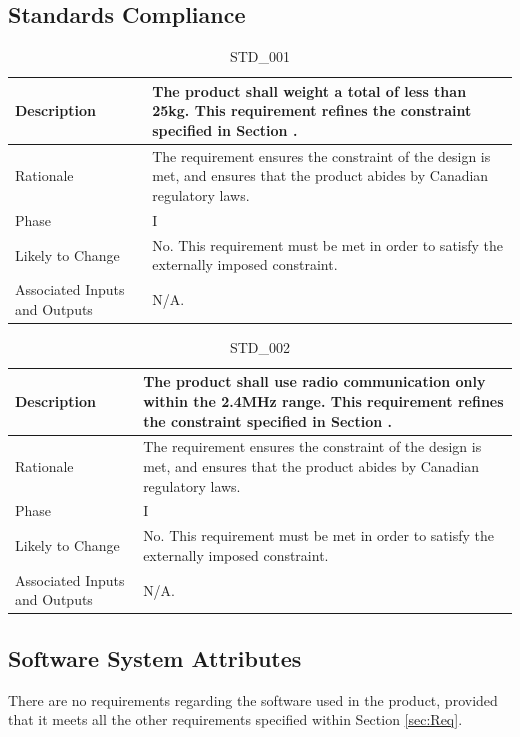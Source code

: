 \documentclass{article}
\begin{document}
\subsection{Standards Compliance }
\begin{table}[!h]
\begin{center}
\caption {STD\_001} 
\label{STD_001}
\begin{tabular}{ | m{3cm} | m{11cm} | }
\hline
Description & The product shall weight a total of less than 25kg. This requirement refines the constraint specified in Section \nameref{sec:Constraints}. \\
\hline
Rationale & The requirement ensures the constraint of the design is met, and ensures that the product abides by Canadian regulatory laws. \\
\hline
Phase & I \\
\hline
Likely to Change &  No. This requirement must be met in order to satisfy the externally imposed constraint. \\
\hline
Associated Inputs and Outputs & N/A.  \\
\hline
\end{tabular}
\end{center}
\end{table}

\begin{table}[!h]
\begin{center}
\caption {STD\_002} 
\label{STD_002}
\begin{tabular}{ | m{3cm} | m{11cm} | }
\hline
Description & The product shall use radio communication only within the 2.4MHz range. This requirement refines the constraint specified in Section \nameref{sec:Constraints}. \\
\hline
Rationale & The requirement ensures the constraint of the design is met, and ensures that the product abides by Canadian regulatory laws. \\
\hline
Phase & I \\
\hline
Likely to Change &  No. This requirement must be met in order to satisfy the externally imposed constraint. \\
\hline
Associated Inputs and Outputs & N/A.  \\
\hline
\end{tabular}
\end{center}
\end{table}

\subsection{Software System Attributes}
There are no requirements regarding the software used in the product, provided that it meets all the other requirements specified within Section \ref{sec:Req}.
\end{document}
